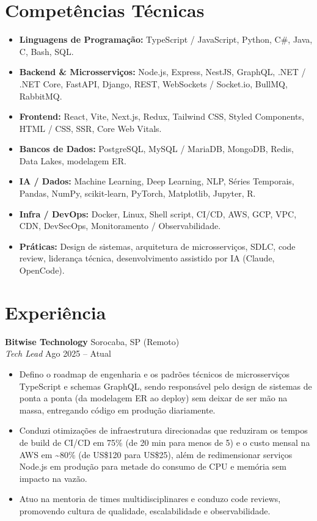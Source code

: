 \documentclass[11pt,a4paper]{article}
\newcommand{\company}[2]{%
  \needspace{5\baselineskip}%
  \textbf{#1} \hfill \textcolor{muted}{#2}\\[3pt]
}
\newcommand{\subrole}[2]{%
  \needspace{4\baselineskip}%
  \textit{#1} \hfill \textcolor{muted}{#2}\\[3pt]
}
\begin{document}
\section{Compet\^encias T\'ecnicas}
\begin{itemize}[leftmargin=14pt, itemsep=2pt, topsep=0pt]
    \item \textbf{Linguagens de Programa\c{c}\~ao:} TypeScript / JavaScript, Python, C\#, Java, C, Bash, SQL.
    \item \textbf{Backend \& Microsservi\c{c}os:} Node.js, Express, NestJS, GraphQL, .NET / .NET Core, FastAPI, Django, REST, WebSockets / Socket.io, BullMQ, RabbitMQ.
    \item \textbf{Frontend:} React, Vite, Next.js, Redux, Tailwind CSS, Styled Components, HTML / CSS, SSR, Core Web Vitals.
    \item \textbf{Bancos de Dados:} PostgreSQL, MySQL / MariaDB, MongoDB, Redis, Data Lakes, modelagem ER.
    \item \textbf{IA / Dados:} Machine Learning, Deep Learning, NLP, S\'eries Temporais, Pandas, NumPy, scikit-learn, PyTorch, Matplotlib, Jupyter, R.
    \item \textbf{Infra / DevOps:} Docker, Linux, Shell script, CI/CD, AWS, GCP, VPC, CDN, DevSecOps, Monitoramento / Observabilidade.
    \item \textbf{Pr\'aticas:} Design de sistemas, arquitetura de microsservi\c{c}os, SDLC, code review, lideran\c{c}a t\'ecnica, desenvolvimento assistido por IA (Claude, OpenCode).
\end{itemize}

\section{Experi\^encia}

\company{Bitwise Technology}{Sorocaba, SP (Remoto)}
\subrole{Tech Lead}{Ago 2025 -- Atual}
\begin{itemize}[leftmargin=14pt, itemsep=2pt, topsep=0pt]
    \item Defino o roadmap de engenharia e os padr\~oes t\'ecnicos de microsservi\c{c}os TypeScript e schemas GraphQL, sendo respons\'avel pelo design de sistemas de ponta a ponta (da modelagem ER ao deploy) sem deixar de ser m\~ao na massa, entregando c\'odigo em produ\c{c}\~ao diariamente.
    \item Conduzi otimiza\c{c}\~oes de infraestrutura direcionadas que reduziram os tempos de build de CI/CD em 75\% (de 20 min para menos de 5) e o custo mensal na AWS em \textasciitilde80\% (de US\$120 para US\$25), al\'em de redimensionar servi\c{c}os Node.js em produ\c{c}\~ao para metade do consumo de CPU e mem\'oria sem impacto na vaz\~ao.
    \item Atuo na mentoria de times multidisciplinares e conduzo code reviews, promovendo cultura de qualidade, escalabilidade e observabilidade.
\end{itemize}
\vspace{3pt}
\end{document}
